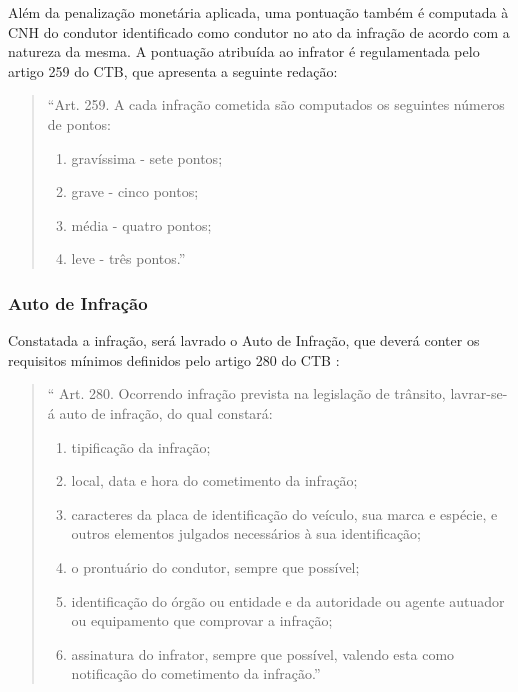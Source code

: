     Além da penalização monetária aplicada, uma pontuação também é computada à CNH do condutor identificado como condutor no ato da infração de acordo com a natureza da mesma. A pontuação atribuída ao infrator é regulamentada pelo artigo 259 do CTB, que apresenta a seguinte redação:
        
        \renewcommand{\theenumi}{\Roman{enumi}}%
        \begin{quote}
            ``Art. 259. A cada infração cometida são computados os seguintes números de pontos:
            
                \begin{enumerate}
                  \item gravíssima - sete pontos;
                  \item grave - cinco pontos;
                  \item média - quatro pontos;
                  \item leve - três pontos.''
                \end{enumerate}
        \end{quote}
        
    \subsubsection{Auto de Infração}
    \label{estrutura_auto_infracao}

    Constatada a infração, será lavrado o Auto de Infração, que deverá conter os requisitos mínimos definidos pelo artigo 280 do CTB \cite{codigo_transito_bra}:

    \begin{quote}
        `` Art. 280. Ocorrendo infração prevista na legislação de trânsito, lavrar-se-á auto de infração, do qual constará:

            \renewcommand{\theenumi}{\Roman{enumi}}%
            \begin{enumerate}
              \item tipificação da infração;
              \item local, data e hora do cometimento da infração;
              \item caracteres da placa de identificação do veículo, sua marca e espécie, e outros elementos julgados necessários à sua identificação;
              \item o prontuário do condutor, sempre que possível;
              \item identificação do órgão ou entidade e da autoridade ou agente autuador ou equipamento que comprovar a infração;
              \item assinatura do infrator, sempre que possível, valendo esta como notificação do cometimento da infração.''
            \end{enumerate}
    \end{quote}




